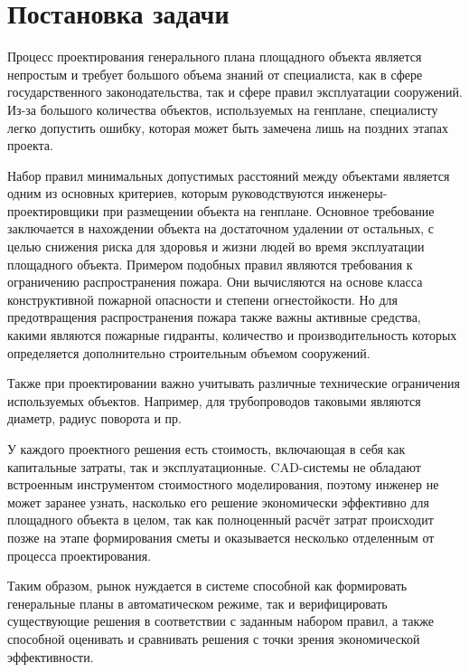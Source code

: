 \section*{\Large{Постановка задачи}}


Процесс проектирования генерального плана площадного объекта является непростым
и требует большого объема знаний от специалиста, как в сфере государственного законодательства,
так и сфере правил эксплуатации сооружений.
Из-за большого количества объектов, используемых на генплане, специалисту легко допустить ошибку,
которая может быть замечена лишь на поздних этапах проекта.

Набор правил минимальных допустимых расстояний между объектами является одним из основных критериев,
которым руководствуются инженеры-проектировщики при размещении объекта на генплане.
Основное требование заключается в нахождении объекта на достаточном удалении от остальных,
с целью снижения риска для здоровья и жизни людей во время эксплуатации площадного объекта.
Примером подобных правил являются
требования к ограничению распространения пожара. \cite{Fire}
Они вычисляются на основе класса конструктивной пожарной опасности и степени огнестойкости.
Но для предотвращения распространения пожара также важны
активные средства, какими являются пожарные гидранты, количество и производительность которых определяется
дополнительно строительным объемом сооружений.

Также при проектировании важно учитывать различные технические ограничения используемых объектов.
Например, для трубопроводов таковыми являются диаметр, радиус поворота и пр.

У каждого проектного решения есть стоимость, включающая в себя как капитальные затраты, так и эксплуатационные.
CAD-системы не обладают встроенным инструментом стоимостного моделирования,
поэтому инженер не может заранее узнать,
насколько его решение экономически эффективно для площадного объекта в целом,
так как полноценный расчёт затрат происходит позже на этапе формирования сметы
и оказывается несколько отделенным от процесса проектирования.

Таким образом, рынок нуждается в системе способной как формировать генеральные планы в автоматическом режиме,
так и верифицировать существующие решения в соответствии с заданным набором правил,
а также способной оценивать и сравнивать решения с точки зрения экономической эффективности.


